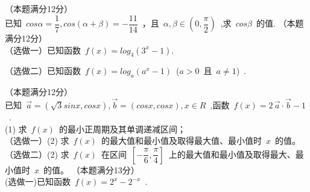 \documentclass[printbox]{BHCexam}
\begin{document}
\begin{questions}
\jianda
\question （本题满分12分）\\
已知~$cos \alpha =\dfrac{1}{7},cos(\alpha+\beta)=-\dfrac{11}{14}$~，且~$\alpha,\beta\in (0,\dfrac{\pi}{2})$~,求~$cos\beta$~的值.
\vspace{7cm}
\question （本题满分12分）\\
{\kaishu （选做一）}已知函数~$f(x)=log_4 (3^x-1)$.
{\kaishu （选做二）}已知函数~$f(x)=log_a (a^x-1)$~($a>0$~且~$a\neq 1$)~.
\vspace{8cm}
\question （本题满分12分）\\
已知~$\vec{a}=(\sqrt{3} sin x,cos x),\vec{b}=(cos x,cos x),x\in R$~,函数~$f(x)=2\,\vec{a}\cdot \vec{b}-1$~.\\%
(1) 求~$f(x)$~的最小正周期及其单调递减区间；\\
{\kaishu （选做一）}(2) 求~$f(x)$~的最大值和最小值及取得最大值、最小值时~$x$~的值。\\
{\kaishu （选做二）}(2) 求~$f(x)$~在区间~$\left[ -\dfrac{\pi}{6},\dfrac{\pi}{4} \right]$~上的最大值和最小值及取得最大、最小值时~$x$~的值。
\vspace{7cm}
\question （本题满分13分）\\
{\kaishu (选做一)}已知函数~$f(x)=2^x-2^{-x}$~.
\end{questions}
\end{document}
